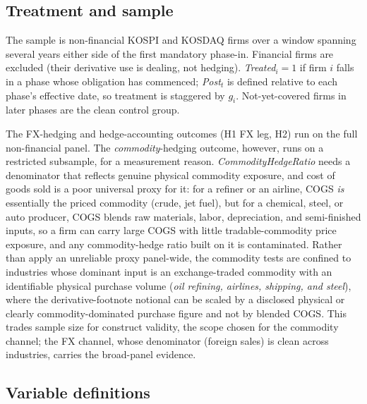 \documentclass[11pt,a4paper]{article}
\begin{document}
\subsection{Treatment and sample}
\label{sec:sample}

The sample is non-financial KOSPI and KOSDAQ firms over a window spanning several years either side of the first mandatory phase-in. Financial firms are excluded (their derivative use is dealing, not hedging). \emph{Treated}$_i=1$ if firm $i$ falls in a phase whose obligation has commenced; \emph{Post}$_t$ is defined relative to each phase's effective date, so treatment is staggered by $g_i$. Not-yet-covered firms in later phases are the clean control group.

The FX-hedging and hedge-accounting outcomes (H1 FX leg, H2) run on the full non-financial panel. The \emph{commodity}-hedging outcome, however, runs on a restricted subsample, for a measurement reason. \emph{CommodityHedgeRatio} needs a denominator that reflects genuine physical commodity exposure, and cost of goods sold is a poor universal proxy for it: for a refiner or an airline, COGS \emph{is} essentially the priced commodity (crude, jet fuel), but for a chemical, steel, or auto producer, COGS blends raw materials, labor, depreciation, and semi-finished inputs, so a firm can carry large COGS with little tradable-commodity price exposure, and any commodity-hedge ratio built on it is contaminated. Rather than apply an unreliable proxy panel-wide, the commodity tests are confined to industries whose dominant input is an exchange-traded commodity with an identifiable physical purchase volume (\emph{oil refining, airlines, shipping, and steel}), where the derivative-footnote notional can be scaled by a disclosed physical or clearly commodity-dominated purchase figure and not by blended COGS. This trades sample size for construct validity, the scope chosen for the commodity channel; the FX channel, whose denominator (foreign sales) is clean across industries, carries the broad-panel evidence.

\subsection{Variable definitions}
\label{sec:variables}
\end{document}
